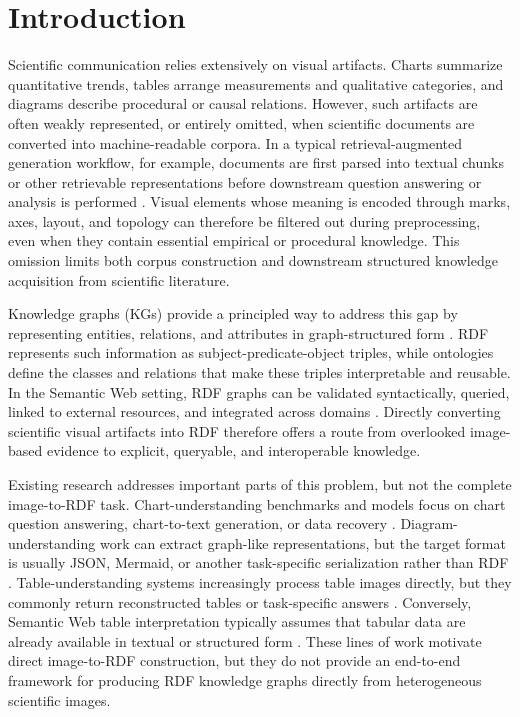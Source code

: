 \documentclass[preprint,12pt]{elsarticle}
\begin{document}
\section{Introduction}\label{sec:intro}

Scientific communication relies extensively on visual artifacts. Charts summarize quantitative trends, tables arrange measurements and qualitative categories, and diagrams describe procedural or causal relations. However, such artifacts are often weakly represented, or entirely omitted, when scientific documents are converted into machine-readable corpora. In a typical retrieval-augmented generation workflow, for example, documents are first parsed into textual chunks or other retrievable representations before downstream question answering or analysis is performed \citep{rag_survey}. Visual elements whose meaning is encoded through marks, axes, layout, and topology can therefore be filtered out during preprocessing, even when they contain essential empirical or procedural knowledge. This omission limits both corpus construction and downstream structured knowledge acquisition from scientific literature.

Knowledge graphs (KGs) provide a principled way to address this gap by representing entities, relations, and attributes in graph-structured form \citep{hogan2021knowledgegraphs}. RDF represents such information as subject-predicate-object triples, while ontologies define the classes and relations that make these triples interpretable and reusable. In the Semantic Web setting, RDF graphs can be validated syntactically, queried, linked to external resources, and integrated across domains \citep{rdf11concepts,turtle}. Directly converting scientific visual artifacts into RDF therefore offers a route from overlooked image-based evidence to explicit, queryable, and interoperable knowledge.

Existing research addresses important parts of this problem, but not the complete image-to-RDF task. Chart-understanding benchmarks and models focus on chart question answering, chart-to-text generation, or data recovery \citep{chartocr,chartqa,vistext,unichart,chartllama}. Diagram-understanding work can extract graph-like representations, but the target format is usually JSON, Mermaid, or another task-specific serialization rather than RDF \citep{diagram2graph,flowlearn}. Table-understanding systems increasingly process table images directly, but they commonly return reconstructed tables or task-specific answers \citep{mmtable,tabpedia}. Conversely, Semantic Web table interpretation typically assumes that tabular data are already available in textual or structured form \citep{semtab2022,semtab2024}. These lines of work motivate direct image-to-RDF construction, but they do not provide an end-to-end framework for producing RDF knowledge graphs directly from heterogeneous scientific images.
\end{document}
